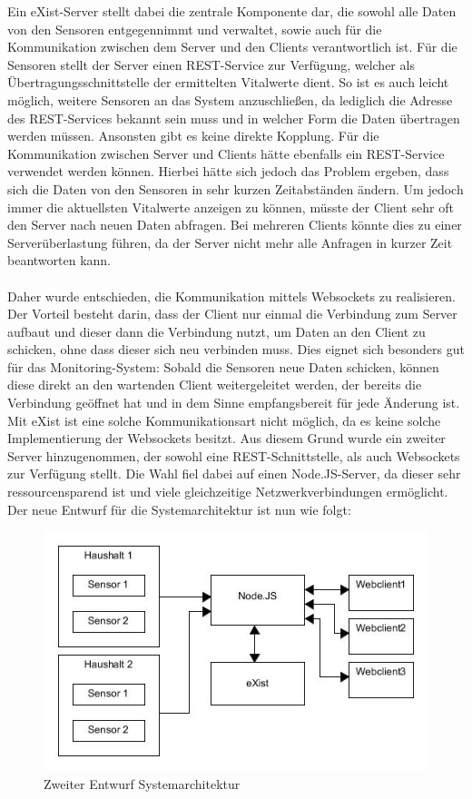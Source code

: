 \newpage
Ein eXist-Server stellt dabei die zentrale Komponente dar, die sowohl alle Daten von den Sensoren entgegennimmt und verwaltet, sowie auch für die Kommunikation zwischen dem Server und den Clients verantwortlich ist. Für die Sensoren stellt der Server einen REST-Service zur Verfügung, welcher als Übertragungsschnittstelle der ermittelten Vitalwerte dient. So ist es auch leicht möglich, weitere Sensoren an das System anzuschließen, da lediglich die Adresse des REST-Services bekannt sein muss und in welcher Form die Daten übertragen werden müssen. Ansonsten gibt es keine direkte Kopplung. Für die Kommunikation zwischen Server und Clients hätte ebenfalls ein REST-Service verwendet werden können. Hierbei hätte sich jedoch das Problem ergeben, dass sich die Daten von den Sensoren in sehr kurzen Zeitabständen ändern. Um jedoch immer die aktuellsten Vitalwerte anzeigen zu können, müsste der Client sehr oft den Server nach neuen Daten abfragen. Bei mehreren Clients könnte dies zu einer Serverüberlastung führen, da der Server nicht mehr alle Anfragen in kurzer Zeit beantworten kann.
\\
\\
Daher wurde entschieden, die Kommunikation mittels Websockets zu realisieren. Der Vorteil besteht darin, dass der Client nur einmal die Verbindung zum Server aufbaut und dieser dann die Verbindung nutzt, um Daten an den Client zu schicken, ohne dass dieser sich neu verbinden muss. Dies eignet sich besonders gut für das Monitoring-System: Sobald die Sensoren neue Daten schicken, können diese direkt an den wartenden Client weitergeleitet werden, der bereits die Verbindung geöffnet hat und in dem Sinne empfangsbereit für jede Änderung ist. Mit eXist ist eine solche Kommunikationsart nicht möglich, da es keine solche Implementierung der Websockets besitzt. Aus diesem Grund wurde ein zweiter Server hinzugenommen, der sowohl eine REST-Schnittstelle, als auch Websockets zur Verfügung stellt. Die Wahl fiel dabei auf einen Node.JS-Server, da dieser sehr ressourcensparend ist und viele gleichzeitige Netzwerkverbindungen ermöglicht. Der neue Entwurf für die Systemarchitektur ist nun wie folgt:

\begin{figure}[h]
\begin{center}
\includegraphics[scale=0.55]{images/sa2.jpg} 
\caption{Zweiter Entwurf Systemarchitektur}
\end{center}
\end{figure}

